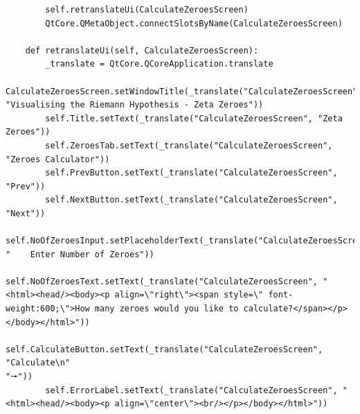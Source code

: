 \documentclass[12pt]{article}
\begin{document}
\begin{lstlisting}
        self.retranslateUi(CalculateZeroesScreen)
        QtCore.QMetaObject.connectSlotsByName(CalculateZeroesScreen)

    def retranslateUi(self, CalculateZeroesScreen):
        _translate = QtCore.QCoreApplication.translate
        CalculateZeroesScreen.setWindowTitle(_translate("CalculateZeroesScreen", "Visualising the Riemann Hypothesis - Zeta Zeroes"))
        self.Title.setText(_translate("CalculateZeroesScreen", "Zeta Zeroes"))
        self.ZeroesTab.setText(_translate("CalculateZeroesScreen", "Zeroes Calculator"))
        self.PrevButton.setText(_translate("CalculateZeroesScreen", "Prev"))
        self.NextButton.setText(_translate("CalculateZeroesScreen", "Next"))
        self.NoOfZeroesInput.setPlaceholderText(_translate("CalculateZeroesScreen", "    Enter Number of Zeroes"))
        self.NoOfZeroesText.setText(_translate("CalculateZeroesScreen", "<html><head/><body><p align=\"right\"><span style=\" font-weight:600;\">How many zeroes would you like to calculate?</span></p></body></html>"))
        self.CalculateButton.setText(_translate("CalculateZeroesScreen", "Calculate\n"
"🠖"))
        self.ErrorLabel.setText(_translate("CalculateZeroesScreen", "<html><head/><body><p align=\"center\"><br/></p></body></html>"))
\end{lstlisting}
\end{document}
